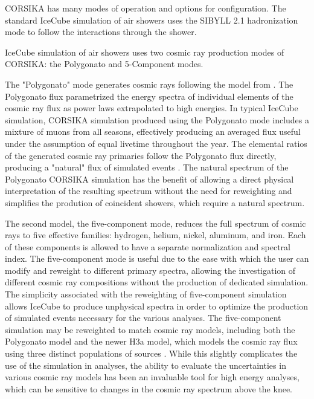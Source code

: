 CORSIKA has many modes of operation and options for configuration. 
The standard IceCube simulation of air showers uses the SIBYLL 2.1 hadronization mode \cite{SIBYLL-2.1} to follow the interactions through the shower. 

IceCube simulation of air showers uses two cosmic ray production modes of CORSIKA: the Polygonato and 5-Component modes.

The "Polygonato" mode generates cosmic rays following the model from \cite{Hoerandel-Polygonato}. 
The Polygonato flux parametrized the energy spectra of individual elements of the cosmic ray flux as power laws extrapolated to high energies.
In typical IceCube simulation, CORSIKA simulation produced using the Polygonato mode includes a mixture of muons from all seasons, effectively producing an averaged flux useful under the assumption of equal livetime throughout the year.
The elemental ratios of the generated cosmic ray primaries follow the Polygonato flux directly, producing a "natural" flux of simulated events \cite{CORSIKA}.
The natural spectrum of the Polygonato CORSIKA simulation has the benefit of allowing a direct physical interpretation of the resulting spectrum without the need for reweighting and simplifies the prodution of coincident showers, which require a natural spectrum.

The second model, the five-component mode, reduces the full spectrum of cosmic rays to five effective families: hydrogen, helium, nickel, aluminum, and iron. 
Each of these components is allowed to have a separate normalization and spectral index.
The five-component mode is useful due to the ease with which the user can modify and reweight to different primary spectra, allowing the investigation of different cosmic ray compositions without the production of dedicated simulation.
The simplicity associated with the reweighting of five-component simulation allows IceCube to produce unphysical spectra in order to optimize the production of simulated events necessary for the various analyses.
The five-component simulation may be reweighted to match cosmic ray models, including both the Polygonato model and the newer H3a model, which models the cosmic ray flux using three distinct populations of sources \cite{Gaisser-H4a}.
While this slightly complicates the use of the simulation in analyses, the ability to evaluate the uncertainties in various cosmic ray models has been an invaluable tool for high energy analyses, which can be sensitive to changes in the cosmic ray spectrum above the knee.


